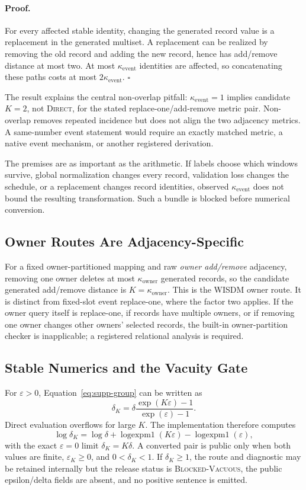 \documentclass[letterpaper]{article} %
\newcommand{\Direct}{\textsc{Direct}}
\newcommand{\ke}{\kappa_{\mathrm{event}}}
\newcommand{\ko}{\kappa_{\mathrm{owner}}}
\newcommand{\epsK}{\varepsilon_K}
\newcommand{\delK}{\delta_K}
\begin{document}
\paragraph{Proof.}
For every affected stable identity, changing the generated record value is a
replacement in the generated multiset.  A replacement can be realized by
removing the old record and adding the new record, hence has add/remove
distance at most two.  At most $\ke$ identities are affected, so concatenating
these paths costs at most $2\ke$. \hfill$\square$

The result explains the central non-overlap pitfall: $\ke=1$ implies candidate
$K=2$, not \Direct{}, for the stated replace-one/add-remove metric pair.
Non-overlap removes repeated incidence but does not align the two adjacency
metrics.  A same-number event statement would require an exactly matched
metric, a native event mechanism, or another registered derivation.

The premises are as important as the arithmetic.  If labels choose which
windows survive, global normalization changes every record, validation loss
changes the schedule, or a replacement changes record identities, observed
$\ke$ does not bound the resulting transformation.  Such a bundle is blocked
before numerical conversion.

\subsection{Owner Routes Are Adjacency-Specific}

For a fixed owner-partitioned mapping and raw \emph{owner add/remove}
adjacency, removing one owner deletes at most $\ko$ generated records, so the
candidate generated add/remove distance is $K=\ko$.  This is the WISDM owner
route.  It is distinct from fixed-slot event replace-one, where the factor two
applies.  If the owner query itself is replace-one, if records have multiple
owners, or if removing one owner changes other owners' selected records, the
built-in owner-partition checker is inapplicable; a registered relational
analysis is required.

\subsection{Stable Numerics and the Vacuity Gate}

For $\varepsilon>0$, Equation~\eqref{eq:supp-group} can be written as
\[
  \delK
  =\delta\frac{\exp(K\varepsilon)-1}{\exp(\varepsilon)-1}.
\]
Direct evaluation overflows for large $K$.  The implementation therefore
computes
\[
  \log\delK
  =\log\delta+
   \operatorname{logexpm1}(K\varepsilon)
   -\operatorname{logexpm1}(\varepsilon),
  \label{eq:supp-logdelta}
\]
with the exact $\varepsilon=0$ limit $\delK=K\delta$.  A converted pair is
public only when both values are finite, $\epsK\geq0$, and
$0<\delK<1$.  If $\delK\geq1$, the route and diagnostic may be retained
internally but the release status is \textsc{Blocked-Vacuous}, the public
epsilon/delta fields are absent, and no positive sentence is emitted.
\end{document}
